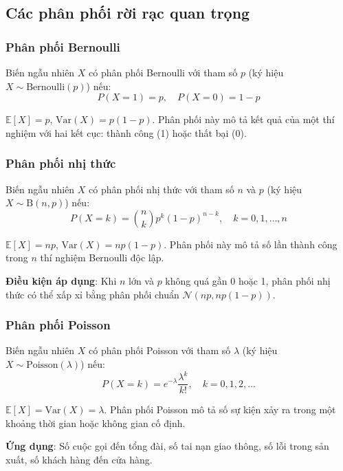 \subsection{Các phân phối rời rạc quan trọng}

\subsubsection*{Phân phối Bernoulli}
\begin{dn}
Biến ngẫu nhiên $X$ có phân phối Bernoulli với tham số $p$ (ký hiệu $X\sim\text{Bernoulli}(p)$) nếu:
\[
P(X=1)=p, \quad P(X=0)=1-p
\]
\end{dn}

\begin{tinhchat}
$\mathbb{E}[X]=p$, $\text{Var}(X)=p(1-p)$. Phân phối này mô tả kết quả của một thí nghiệm với hai kết cục: thành công (1) hoặc thất bại (0).
\end{tinhchat}

\subsubsection*{Phân phối nhị thức}
\begin{dn}
Biến ngẫu nhiên $X$ có phân phối nhị thức với tham số $n$ và $p$ (ký hiệu $X\sim\mathrm{B}(n,p)$) nếu:
\[
P(X=k)=\binom{n}{k}p^k(1-p)^{n-k}, \quad k=0,1,\ldots,n
\]
\end{dn}

\begin{tinhchat}
$\mathbb{E}[X]=np$, $\text{Var}(X)=np(1-p)$. Phân phối này mô tả số lần thành công trong $n$ thí nghiệm Bernoulli độc lập.

\textbf{Điều kiện áp dụng}: Khi $n$ lớn và $p$ không quá gần 0 hoặc 1, phân phối nhị thức có thể xấp xỉ bằng phân phối chuẩn $\mathcal{N}(np, np(1-p))$.
\end{tinhchat}

\subsubsection*{Phân phối Poisson}
\begin{dn}
Biến ngẫu nhiên $X$ có phân phối Poisson với tham số $\lambda$ (ký hiệu $X\sim\text{Poisson}(\lambda)$) nếu:
\[
P(X=k)=e^{-\lambda}\frac{\lambda^k}{k!}, \quad k=0,1,2,\ldots
\]
\end{dn}

\begin{tinhchat}
$\mathbb{E}[X]=\text{Var}(X)=\lambda$. Phân phối Poisson mô tả số sự kiện xảy ra trong một khoảng thời gian hoặc không gian cố định.

\textbf{Ứng dụng}: Số cuộc gọi đến tổng đài, số tai nạn giao thông, số lỗi trong sản xuất, số khách hàng đến cửa hàng.
\end{tinhchat}

